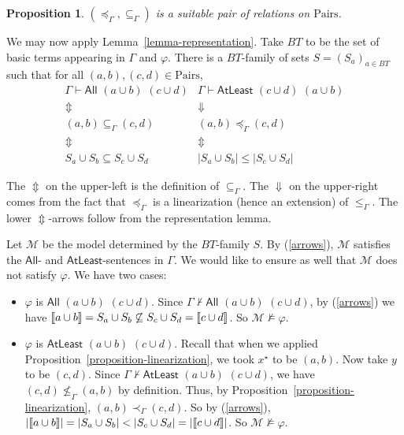 \documentclass[letterpaper]{article} %
\newtheorem{proposition}[theorem]{Proposition}
\theoremstyle{definition}
\newcommand{\semantics}[1]{[\![\mbox{\em $ #1 $\/}]\!]}
\newcommand{\Model}{\mathcal{M}}
\newcommand{\proves}{\vdash}
\newcommand{\All}[2]{\mathsf{All}\,\,#1\,\,#2}
\newcommand{\Atleast}[2]{\mathsf{AtLeast}\,\,#1\,\,#2}
\newcommand{\AllNoArgs}{\mathsf{All}}
\newcommand{\AtleastNoArgs}{\mathsf{AtLeast}}
\newcommand{\Pairs}{\mbox{Pairs}}
\newcommand{\provsub}{\subseteq_{\Gamma}}
\newcommand{\provle}{\le_{\Gamma}}
\newcommand{\provextended}{\preceq_{\Gamma}}
\newcommand{\provextendedstrict}{\prec_{\Gamma}}
\begin{document}
\begin{proposition}
\label{proposition-suitablepair}
$(\provextended, \provsub)$ is a suitable pair of relations on $\Pairs$.
\end{proposition}

We may now apply Lemma~\ref{lemma-representation}. Take $BT$ to be the set of basic terms appearing in $\Gamma$ and $\varphi$.  There is a $BT$-family of sets $S = (S_a)_{a\in BT}$ such that for all 
$(a,b),(c,d) \in \Pairs$,
\begin{equation}
\label{arrows}
\begin{array}{cc}
\Gamma \proves \All{(a \cup b)}{(c \cup d)} & 
\Gamma \proves \Atleast{(c \cup d)}{(a \cup b)}\\
\Updownarrow &
\Downarrow\\
(a,b) \provsub (c,d) &
(a,b) \provextended (c,d)\\
\Updownarrow &
\Updownarrow\\
S_a \cup S_b \subseteq S_c \cup S_d &
|S_a \cup S_b| \le |S_c \cup S_d|
\end{array}
\end{equation}

The $\Updownarrow$ on the upper-left  is the definition of $\provsub$.
The $\Downarrow$ on the upper-right comes from the fact that $\provextended$ is a linearization (hence an extension) of $\provle$.  The lower $\Updownarrow$-arrows follow from the representation lemma.

Let $\Model$ be the model determined by the $BT$-family $S$. By (\ref{arrows}), $\Model$ satisfies the $\AllNoArgs$- and $\AtleastNoArgs$-sentences in $\Gamma$.  We would like to ensure as well that $\Model$ does not satisfy $\varphi$.  We have two cases:

\begin{itemize}
    \item $\varphi$ is $\All{(a \cup b)}{(c \cup d)}$.
    Since $\Gamma \not \proves \All{(a \cup b)}{(c \cup d)}$, by (\ref{arrows}) we have $\semantics{a \cup b} = S_a \cup S_b \not \subseteq S_c \cup S_d = \semantics{c \cup d}$.  So $\Model \not \models \varphi$.
    
    \item $\varphi$ is $\Atleast{(a \cup b)}{(c \cup d)}$.
    Recall that when we applied Proposition~\ref{proposition-linearization}, we took $x^\star$ to be $(a, b)$.  Now take $y$ to be $(c, d)$.  Since $\Gamma \not \proves \Atleast{(a \cup b)}{(c \cup d)}$, we have $(c, d) \not \provle (a, b)$ by definition.  Thus, by Proposition~\ref{proposition-linearization}, $(a, b) \provextendedstrict (c, d)$.  So by (\ref{arrows}), $|\semantics{a \cup b}| = |S_a \cup S_b| < |S_c \cup S_d| = |\semantics{c \cup d}|$.  So $\Model \not \models \varphi$.
    
\end{itemize}
\end{document}
